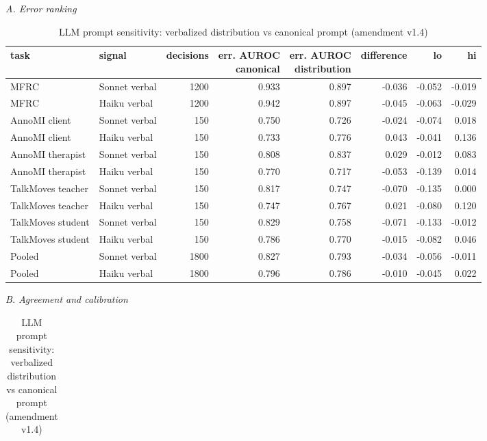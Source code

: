 \begin{table}[t]
\centering
\small
\caption{LLM prompt sensitivity: verbalized distribution vs canonical prompt (amendment v1.4)}
\label{tab:tab19_prompt_sensitivity}
\par\textit{A. Error ranking}\par\smallskip
\begin{adjustbox}{max width=\linewidth}
\begin{tabular}{llrrrrrr}
\toprule
task & signal & decisions & \makecell[br]{err. AUROC \\{} canonical} & \makecell[br]{err. AUROC \\{} distribution} & difference & lo & hi \\
\midrule
MFRC & Sonnet verbal & 1200 & 0.933 & 0.897 & -0.036 & -0.052 & -0.019 \\
MFRC & Haiku verbal & 1200 & 0.942 & 0.897 & -0.045 & -0.063 & -0.029 \\
AnnoMI client & Sonnet verbal & 150 & 0.750 & 0.726 & -0.024 & -0.074 & 0.018 \\
AnnoMI client & Haiku verbal & 150 & 0.733 & 0.776 & 0.043 & -0.041 & 0.136 \\
AnnoMI therapist & Sonnet verbal & 150 & 0.808 & 0.837 & 0.029 & -0.012 & 0.083 \\
AnnoMI therapist & Haiku verbal & 150 & 0.770 & 0.717 & -0.053 & -0.139 & 0.014 \\
TalkMoves teacher & Sonnet verbal & 150 & 0.817 & 0.747 & -0.070 & -0.135 & 0.000 \\
TalkMoves teacher & Haiku verbal & 150 & 0.747 & 0.767 & 0.021 & -0.080 & 0.120 \\
TalkMoves student & Sonnet verbal & 150 & 0.829 & 0.758 & -0.071 & -0.133 & -0.012 \\
TalkMoves student & Haiku verbal & 150 & 0.786 & 0.770 & -0.015 & -0.082 & 0.046 \\
Pooled & Sonnet verbal & 1800 & 0.827 & 0.793 & -0.034 & -0.056 & -0.011 \\
Pooled & Haiku verbal & 1800 & 0.796 & 0.786 & -0.010 & -0.045 & 0.022 \\
\bottomrule
\end{tabular}
\end{adjustbox}
\medskip
\par\textit{B. Agreement and calibration}\par\smallskip
\begin{adjustbox}{max width=\linewidth}
\begin{tabular}{llrrrrr}

\end{tabular}
\end{adjustbox}
\end{table}
